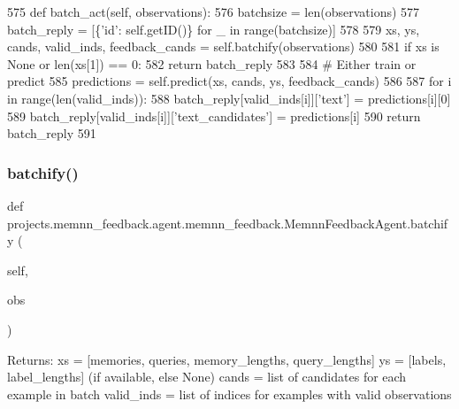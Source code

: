 \begin{DoxyCode}
575     \textcolor{keyword}{def }batch\_act(self, observations):
576         batchsize = len(observations)
577         batch\_reply = [\{\textcolor{stringliteral}{'id'}: self.getID()\} \textcolor{keywordflow}{for} \_ \textcolor{keywordflow}{in} range(batchsize)]
578 
579         xs, ys, cands, valid\_inds, feedback\_cands = self.batchify(observations)
580 
581         \textcolor{keywordflow}{if} xs \textcolor{keywordflow}{is} \textcolor{keywordtype}{None} \textcolor{keywordflow}{or} len(xs[1]) == 0:
582             \textcolor{keywordflow}{return} batch\_reply
583 
584         \textcolor{comment}{# Either train or predict}
585         predictions = self.predict(xs, cands, ys, feedback\_cands)
586 
587         \textcolor{keywordflow}{for} i \textcolor{keywordflow}{in} range(len(valid\_inds)):
588             batch\_reply[valid\_inds[i]][\textcolor{stringliteral}{'text'}] = predictions[i][0]
589             batch\_reply[valid\_inds[i]][\textcolor{stringliteral}{'text\_candidates'}] = predictions[i]
590         \textcolor{keywordflow}{return} batch\_reply
591 
\end{DoxyCode}
\mbox{\label{classprojects_1_1memnn__feedback_1_1agent_1_1memnn__feedback_1_1MemnnFeedbackAgent_a9fafb9b83a4dcb66d07f40a70826b594}} 
\subsubsection{\texorpdfstring{batchify()}{batchify()}}
{\footnotesize\ttfamily def projects.\+memnn\+\_\+feedback.\+agent.\+memnn\+\_\+feedback.\+Memnn\+Feedback\+Agent.\+batchify (\begin{DoxyParamCaption}\item[{}]{self,  }\item[{}]{obs }\end{DoxyParamCaption})}

\begin{DoxyVerb}Returns:
    xs = [memories, queries, memory_lengths, query_lengths]
    ys = [labels, label_lengths] (if available, else None)
    cands = list of candidates for each example in batch
    valid_inds = list of indices for examples with valid observations
\end{DoxyVerb}
 

